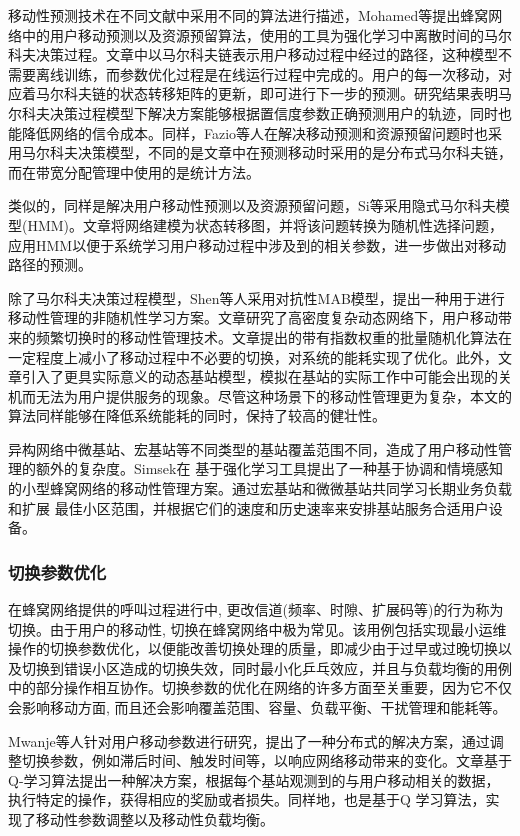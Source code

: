 ﻿\documentclass[11pt,draftclsnofoot,onecolumn,journal,letterpaper]{IEEEtran}
\begin{document}
移动性预测技术在不同文献中采用不同的算法进行描述，Mohamed等\cite{Mohamed2015}提出蜂窝网络中的用户移动预测以及资源预留算法，使用的工具为强化学习中离散时间的马尔科夫决策过程。文章中以马尔科夫链表示用户移动过程中经过的路径，这种模型不需要离线训练，而参数优化过程是在线运行过程中完成的。用户的每一次移动，对应着马尔科夫链的状态转移矩阵的更新，即可进行下一步的预测。研究结果表明马尔科夫决策过程模型下解决方案能够根据置信度参数正确预测用户的轨迹，同时也能降低网络的信令成本。同样，Fazio等人\cite{Fazio2013}在解决移动预测和资源预留问题时也采用马尔科夫决策模型，不同的是文章中在预测移动时采用的是分布式马尔科夫链，而在带宽分配管理中使用的是统计方法。

类似的，同样是解决用户移动性预测以及资源预留问题，Si等\cite{Si2010}采用隐式马尔科夫模型(HMM)。文章将网络建模为状态转移图，并将该问题转换为随机性选择问题，应用HMM以便于系统学习用户移动过程中涉及到的相关参数，进一步做出对移动路径的预测。

除了马尔科夫决策过程模型，Shen等人采用对抗性MAB模型\cite{Shen2016}，提出一种用于进行移动性管理的非随机性学习方案。文章研究了高密度复杂动态网络下，用户移动带来的频繁切换时的移动性管理技术。文章提出的带有指数权重的批量随机化算法在一定程度上减小了移动过程中不必要的切换，对系统的能耗实现了优化。此外，文章引入了更具实际意义的动态基站模型，模拟在基站的实际工作中可能会出现的关机而无法为用户提供服务的现象。尽管这种场景下的移动性管理更为复杂，本文的算法同样能够在降低系统能耗的同时，保持了较高的健壮性。

异构网络中微基站、宏基站等不同类型的基站覆盖范围不同，造成了用户移动性管理的额外的复杂度。Simsek在
\cite{Simsek2015a}基于强化学习工具提出了一种基于协调和情境感知的小型蜂窝网络的移动性管理方案。通过宏基站和微微基站共同学习长期业务负载和扩展 最佳小区范围，并根据它们的速度和历史速率来安排基站服务合适用户设备。

\subsubsection{切换参数优化}
在蜂窝网络提供的呼叫过程进行中, 更改信道(频率、时隙、扩展码等)的行为称为 切换。由于用户的移动性, 切换在蜂窝网络中极为常见。该用例包括实现最小运维操作的切换参数优化，以便能改善切换处理的质量，即减少由于过早或过晚切换以及切换到错误小区造成的切换失效，同时最小化乒乓效应，并且与负载均衡的用例中的部分操作相互协作。切换参数的优化在网络的许多方面至关重要，因为它不仅会影响移动方面, 而且还会影响覆盖范围、容量、负载平衡、干扰管理和能耗等。


Mwanje等人\cite{Mwanje2014}针对用户移动参数进行研究，提出了一种分布式的解决方案，通过调整切换参数，例如滞后时间、触发时间等，以响应网络移动带来的变化。文章基于Q-学习算法提出一种解决方案，根据每个基站观测到的与用户移动相关的数据，执行特定的操作，获得相应的奖励或者损失。同样地，\cite{Mwanje2013}也是基于Q 学习算法，实现了移动性参数调整以及移动性负载均衡。
\end{document}
